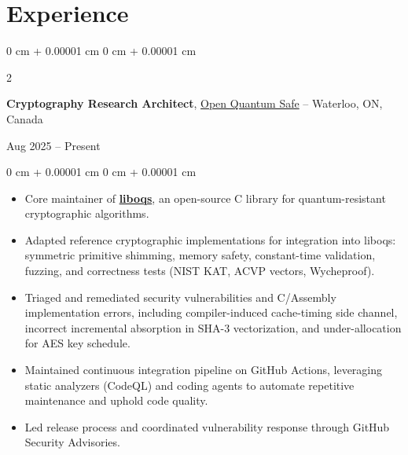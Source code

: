 \documentclass[10pt, letterpaper]{article}
\newenvironment{highlights}{
    \begin{itemize}[
        topsep=0.10 cm,
        parsep=0.10 cm,
        partopsep=0pt,
        itemsep=0pt,
        leftmargin=0 cm + 10pt
    ]
}{
    \end{itemize}
} %
\newenvironment{onecolentry}{
    \begin{adjustwidth}{
        0 cm + 0.00001 cm
    }{
        0 cm + 0.00001 cm
    }
}{
    \end{adjustwidth}
} %
\newenvironment{twocolentry}[2][]{
    \onecolentry
    \def\secondColumn{#2}
    \setcolumnwidth{\fill, 4.5 cm}
    \begin{paracol}{2}
}{
    \switchcolumn \raggedleft \secondColumn
    \end{paracol}
    \endonecolentry
} %
\begin{document}
    \section{Experience}
        \begin{twocolentry}{
            Aug 2025 -- Present
        }
            \textbf{Cryptography Research Architect}, \href{https://openquantumsafe.org/}{Open Quantum Safe} -- Waterloo, ON, Canada
        \end{twocolentry}
        \vspace{0.10 cm}
        \begin{onecolentry}
            \begin{highlights}
                \item Core maintainer of \href{https://github.com/open-quantum-safe/liboqs}{\textbf{liboqs}},
                an open-source C library for quantum-resistant cryptographic algorithms.
                \item Adapted reference cryptographic implementations for integration
                into liboqs: symmetric primitive shimming, memory
                safety, constant-time validation, fuzzing, and correctness tests
                (NIST KAT, ACVP vectors, Wycheproof).
                \item Triaged and remediated security vulnerabilities and C/Assembly
                implementation errors, including compiler-induced cache-timing
                side channel, incorrect incremental absorption in SHA-3 vectorization,
                and under-allocation for AES key schedule.
                \item Maintained continuous integration pipeline on GitHub Actions,
                leveraging static analyzers (CodeQL) and coding agents to automate
                repetitive maintenance and uphold code quality.
                \item Led release process and coordinated vulnerability response through GitHub Security Advisories.
            \end{highlights}
        \end{onecolentry}
        \vspace{0.2 cm}

\end{document}
